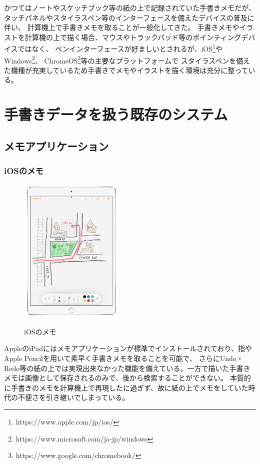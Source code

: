 かつてはノートやスケッチブック等の紙の上で記録されていた手書きメモだが、タッチパネルやスタイラスペン等のインターフェースを備えたデバイスの普及に伴い、
計算機上で手書きメモを取ることが一般化してきた。
手書きメモやイラストを計算機の上で描く場合、マウスやトラックパッド等のポインティングデバイスではなく、
ペンインターフェースが好ましいとされるが、iOS\footnote{https://www.apple.com/jp/ios/}やWindows\footnote{https://www.microsoft.com/ja-jp/windows}、
ChromeOS\footnote{https://www.google.com/chromebook/}等の主要なプラットフォームで
スタイラスペンを備えた機種が充実しているため手書きでメモやイラストを描く環境は充分に整っている。

\section{手書きデータを扱う既存のシステム}

\subsection{メモアプリケーション}


\subsubsection{iOSのメモ}

\begin{figure}[htbp]
    \begin{center}
        {\includegraphics[width=50mm]{images/applememo.png}} \end{center}
    \caption{iOSのメモ}
\end{figure}

AppleのiPadにはメモアプリケーションが標準でインストールされており、指やApple Pencilを用いて素早く手書きメモを取ることを可能で、
さらにUndo・Redo等の紙の上では実現出来なかった機能を備えている。一方で描いた手書きメモは画像として保存されるのみで、後から検索することができない。
本質的に手書きのメモを計算機上で再現したに過ぎず、故に紙の上でメモをしていた時代の不便さを引き継いでしまっている。


